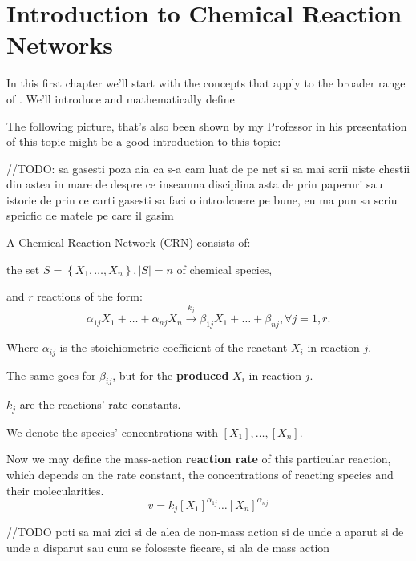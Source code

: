 \chapter{Introduction to Chemical Reaction Networks}\label{chap:ch1}

In this first chapter we'll start with the concepts that apply to the broader range of . We'll introduce and mathematically define

The following picture, that's also been shown by my Professor in his presentation of this topic might be a good introduction to this topic:

\hfill\break
//TODO: sa gasesti poza aia ca s-a cam luat de pe net
si sa mai scrii niste chestii din astea in mare de despre ce inseamna disciplina asta de prin paperuri sau istorie de prin ce carti gasesti sa faci o introdcuere pe bune, eu ma pun sa scriu speicfic de matele pe care il gasim
\hfill\break

A Chemical Reaction Network (CRN) consists of:

the set $S = \left\{ X_1, \dots, X_n \right\}, \left| S \right| = n$ of chemical species,

and $r$ reactions of the form:
\begin{equation}\label{mass-action_network}
	\alpha_{1j} X_1 + \dots + \alpha_{n j} X_n \xrightarrow{k_j} \beta_{1j} X_1 + \dots + \beta_{n j}, \forall j = \overline{1,r}.	
\end{equation}

Where $\alpha_{ij}$ is the stoichiometric coefficient of the reactant $X_i$ in reaction $j$.

The same goes for $\beta_{ij}$, but for the \textbf{produced} $X_i$ in reaction $j$.

$k_j$ are the reactions' rate constants.

We denote the species' concentrations with $[X_1], \dots, [X_n]$.

Now we may define the mass-action \textbf{reaction rate} of this particular reaction, which depends on the rate constant, the concentrations of reacting species and their molecularities.
\begin{equation}\label{reaction_rate}
	v = k_j [X_1]^{\alpha_{1j}} \dots [X_n]^{\alpha_{nj}}
\end{equation}

\hfill\break
//TODO poti sa mai zici si de alea de non-mass action si de unde a aparut si de unde a disparut sau cum se foloseste fiecare, si ala de mass action
\hfill\break

